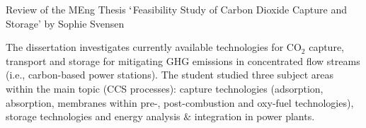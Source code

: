 \documentclass[14pt,twoside]{report}
\begin{document}
\clearpage


\bigskip

\begin{center}
  {\Large Review of the MEng Thesis $\lq$Feasibility Study of Carbon Dioxide Capture and Storage' by Sophie Svensen}
\end{center}

\medskip

The dissertation investigates currently available technologies for CO$_{2}$ capture, transport and storage for mitigating GHG emissions in concentrated flow streams (i.e., carbon-based power stations). The student studied three subject areas within the main topic (CCS processes): capture technologies (adsorption, absorption, membranes within pre-, post-combustion and oxy-fuel technologies),  storage technologies and energy analysis $\&$ integration in power plants. 
\end{document}
